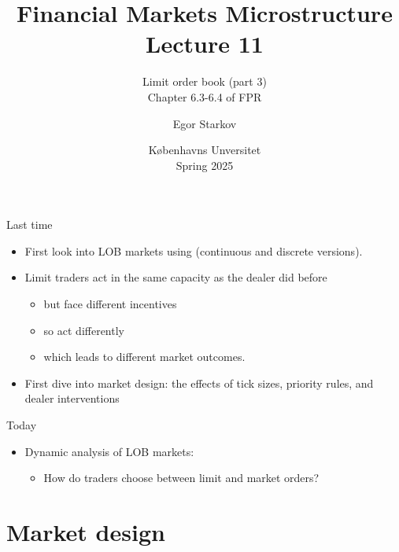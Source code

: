 \documentclass[english,10pt
,aspectratio=169
]{beamer}
\title{Financial Markets Microstructure \\ Lecture 11}
\subtitle{Limit order book (part 3)\\
	Chapter 6.3-6.4 of FPR}
\author{Egor Starkov}
\date{K{\o}benhavns Unversitet \\
	Spring 2025}
\begin{document}
\frame[plain]{\titlepage}


\begin{frame}{Last time}
	\begin{itemize}
		\item First look into LOB markets using \cite{glosten_is_1994} (continuous and discrete versions).
		\item Limit traders act in the same capacity as the dealer did before
		\begin{itemize}
			\item but face different incentives
			\item so act differently
			\item which leads to different market outcomes.
		\end{itemize}
		\item First dive into market design: the effects of tick sizes, priority rules, and dealer interventions
	\end{itemize}
\end{frame}


\begin{frame}{Today}
	\begin{itemize}
		\item Dynamic analysis of LOB markets:
		\begin{itemize}
			\item How do traders choose between limit and market orders?
		\end{itemize}
	\end{itemize}
\end{frame}







\section{Market design}
\end{document}
